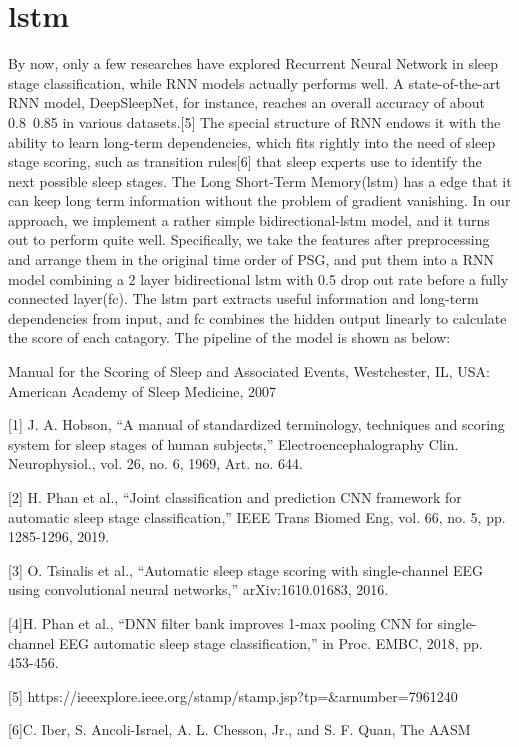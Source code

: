 \documentclass{article}
\begin{document}
\section{lstm}
By now, only a few researches have explored Recurrent Neural Network in sleep stage classification, while RNN models actually performs well. A state-of-the-art RNN model, DeepSleepNet, for instance, reaches an overall accuracy of about 0.8~0.85 in various datasets.[5] The special structure of RNN endows it with the ability to learn long-term dependencies, which fits rightly into the need of sleep stage scoring, such as transition rules[6] that sleep experts use to identify the next possible sleep stages. The Long Short-Term Memory(lstm) has a edge that it can keep long term information without the problem of gradient vanishing. In our approach, we implement a rather simple bidirectional-lstm model, and it turns out to perform quite well. Specifically, we take the features after preprocessing and arrange them in the original time order of PSG, and put them into a RNN model combining a 2 layer bidirectional lstm with 0.5 drop out rate before a fully connected layer(fc). The lstm part extracts useful information and long-term dependencies from input, and fc combines the hidden output linearly to calculate the score of each catagory. 
The pipeline of the model is shown as below:

Manual for the Scoring of Sleep and Associated Events, Westchester,
IL, USA: American Academy of Sleep Medicine, 2007


[1] J. A. Hobson, “A manual of standardized terminology, techniques and
scoring system for sleep stages of human subjects,” Electroencephalography Clin. Neurophysiol., vol. 26, no. 6, 1969, Art. no. 644.

[2] H. Phan et al., “Joint classification and prediction CNN framework for
automatic sleep stage classification,” IEEE Trans Biomed Eng, vol. 66,
no. 5, pp. 1285-1296, 2019.

[3] O. Tsinalis et al., “Automatic sleep stage scoring with single-channel
EEG using convolutional neural networks,” arXiv:1610.01683, 2016.

[4]H. Phan et al., “DNN filter bank improves 1-max pooling CNN for
single-channel EEG automatic sleep stage classification,” in Proc.
EMBC, 2018, pp. 453-456.

[5] https://ieeexplore.ieee.org/stamp/stamp.jsp?tp=\&arnumber=7961240

[6]C. Iber, S. Ancoli-Israel, A. L. Chesson, Jr., and S. F. Quan, The AASM
\end{document}
